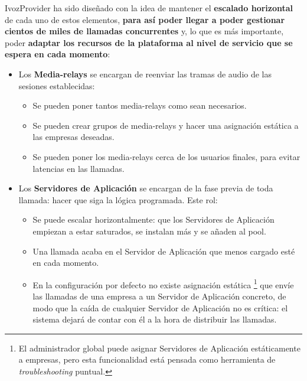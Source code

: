 \documentclass[letterpaper,10pt,spanish]{sphinxmanual}
\begin{document}
IvozProvider ha sido diseñado con la idea de mantener el \textbf{escalado horizontal} de cada uno de estos elementos, \textbf{para así poder llegar a poder gestionar cientos de miles de llamadas concurrentes} y, lo que es más importante, poder \textbf{adaptar los recursos de la plataforma al nivel de servicio que se espera en cada momento}:
\begin{itemize}
\item {} 
Los \textbf{Media-relays} se encargan de reenviar las tramas de audio de las sesiones establecidas:
\begin{itemize}
\item {} 
Se pueden poner tantos media-relays como sean necesarios.

\item {} 
Se pueden crear grupos de media-relays y hacer una asignación estática a las empresas deseadas.

\item {} 
Se pueden poner los media-relays cerca de los usuarios finales, para evitar latencias en las llamadas.

\end{itemize}

\item {} 
Los \textbf{Servidores de Aplicación} se encargan de la fase previa de toda llamada: hacer que siga la lógica programada. Este rol:
\begin{itemize}
\item {} 
Se puede escalar horizontalmente: que los Servidores de Aplicación empiezan a estar saturados, se instalan más y se añaden al pool.

\item {} 
Una llamada acaba en el Servidor de Aplicación que menos cargado esté en cada momento.

\item {} 
En la configuración por defecto no existe asignación estática \footnote[*]{\sphinxAtStartFootnote%
El administrador global puede asignar Servidores de Aplicación estáticamente a empresas, pero esta funcionalidad está pensada como herramienta de \emph{troubleshooting} puntual.
} que envíe las llamadas de una empresa a un Servidor de Aplicación concreto, de modo que la caída de cualquier Servidor de Aplicación no es crítica: el sistema dejará de contar con él a la hora de distribuir las llamadas.

\end{itemize}

\end{itemize}
\end{document}
